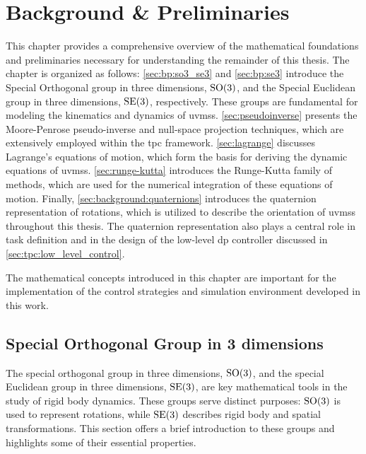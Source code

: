 \chapter{Background \& {Preliminaries}}
\label{ch:background}

This chapter provides a comprehensive overview of the mathematical foundations and preliminaries necessary for understanding the remainder of this thesis. The chapter is organized as follows: \autoref{sec:bp:so3_se3} and \autoref{sec:bp:se3} introduce the Special Orthogonal group in three dimensions, $\operatorname{SO}(3)$, and the Special Euclidean group in three dimensions, $\operatorname{SE}(3)$, respectively. These groups are fundamental for modeling the kinematics and dynamics of \gls{uvms}s.
\autoref{sec:pseudoinverse} presents the Moore-Penrose pseudo-inverse and null-space projection techniques, which are extensively employed within the \gls{tpc} framework. \autoref{sec:lagrange} discusses Lagrange's equations of motion, which form the basis for deriving the dynamic equations of \gls{uvms}s. \autoref{sec:runge-kutta} introduces the Runge-Kutta family of methods, which are used for the numerical integration of these equations of motion.
Finally, \autoref{sec:background:quaternions} introduces the quaternion representation of rotations, which is utilized to describe the orientation of \gls{uvms}s throughout this thesis. The quaternion representation also plays a central role in task definition and in the design of the low-level \gls{dp} controller discussed in \autoref{sec:tpc:low_level_control}.

The mathematical concepts introduced in this chapter are important for the implementation of the control strategies and simulation environment developed in this work.


\section{Special Orthogonal Group in 3 dimensions}
\label{sec:bp:so3_se3}

The special orthogonal group in three dimensions, $\operatorname{SO}(3)$, and the special
Euclidean group in three dimensions, $\operatorname{SE}(3)$, are key mathematical tools in the
study of rigid body dynamics. These groups serve distinct purposes: $\operatorname{SO}(3)$ is
used to represent rotations, while $\operatorname{SE}(3)$ describes rigid body and spatial
transformations. This section offers a brief introduction to these groups and
highlights some of their essential properties.

